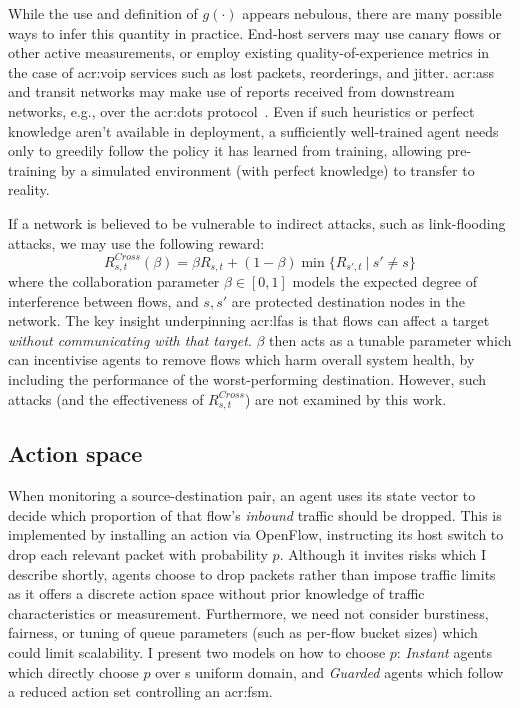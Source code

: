 While the use and definition of $g(\cdot)$ appears nebulous, there are many possible ways to infer this quantity in practice.
End-host servers may use canary flows or other active measurements, or employ existing quality-of-experience metrics in the case of \gls{acr:voip} services such as lost packets, reorderings, and jitter.
\glspl{acr:as} and transit networks may make use of reports received from downstream networks, e.g., over the \gls{acr:dots} protocol~\parencite{ietf-dots-use-cases-17}.
Even if such heuristics or perfect knowledge aren't available in deployment, a sufficiently well-trained agent needs only to greedily follow the policy it has learned from training, allowing pre-training by a simulated environment (with perfect knowledge) to transfer to reality.

If a network is believed to be vulnerable to indirect attacks, such as link-flooding attacks, we may use the following reward:
\begin{equation}
	R_{s,t}^{\mathit{Cross}}(\beta) = \beta R_{s,t} + (1 - \beta) \min{\{R_{s',t}~|~s' \ne s\}} \label{eqn:lfa-reward}
\end{equation}
where the collaboration parameter $\beta \in [0,1]$ models the expected degree of interference between flows, and $s, s'$ are protected destination nodes in the network.
The key insight underpinning \glspl{acr:lfa} is that flows can affect a target \emph{without communicating with that target}.
$\beta$ then acts as a tunable parameter which can incentivise agents to remove flows which harm overall system health, by including the performance of the worst-performing destination.
However, such attacks (and the effectiveness of $R_{s,t}^{\mathit{Cross}}$) are not examined by this work.

\subsection{Action space}\label{sec:ddos-action-space-risks}
When monitoring a source-destination pair, an agent uses its state vector to decide which proportion of that flow's \emph{inbound} traffic should be dropped.
This is implemented by installing an action via OpenFlow, instructing its host switch to drop each relevant packet with probability $p$.
Although it invites risks which I describe shortly, agents choose to drop packets rather than impose traffic limits as it offers a discrete action space without prior knowledge of traffic characteristics or measurement.
Furthermore, we need not consider burstiness, fairness, or tuning of queue parameters (such as per-flow bucket sizes) which could limit scalability.
I present two models on how to choose $p$: \emph{Instant} agents which directly choose $p$ over s uniform domain, and \emph{Guarded} agents which follow a reduced action set controlling an \gls{acr:fsm}.

